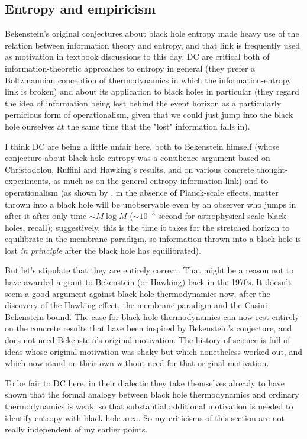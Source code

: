 \documentclass[12pt]{article}
\begin{document}
\subsection{Entropy and empiricism}

Bekenstein's original conjectures about black hole entropy made heavy use of the relation between information theory and entropy, and that link is frequently used as motivation in textbook discussions to this day. DC are critical both of information-theoretic approaches to entropy in general (they prefer a Boltzmannian conception of thermodynamics in which the information-entropy link is broken) and about its application to black holes in particular (they regard the idea of information being lost behind the event horizon as a particularly pernicious form of operationalism, given that we could just jump into the black hole ourselves at the same time that the "lost" information falls in). 

I think DC are being a little unfair here, both to Bekenstein himself (whose conjecture about black hole entropy was a consilience argument based on Christodolou, Ruffini and Hawking's results, and on various concrete thought-experiments, as much as on the general entropy-information link) and to operationalism (as shown by , in the absence of Planck-scale effects, matter thrown into a black hole will be unobservable even by an observer who jumps in after it after only time $\sim M \log M$ ($\sim 10^{-3}$ second for astrophysical-scale black holes, recall); suggestively, this is the time it takes for the stretched horizon to equilibrate in the membrane paradigm, so information thrown into a black hole is lost \emph{in principle} after the black hole has equilibrated). 

But let's stipulate that they are entirely correct. That might be a reason not to have awarded a grant to Bekenstein (or Hawking) back in the 1970s. It doesn't seem a good argument against black hole thermodynamics now, after the discovery of the Hawking effect, the membrane paradigm and the Casini-Bekenstein bound. The case for black hole thermodynamics can now rest entirely on the concrete results that have been inspired by Bekenstein's conjecture, and does not need Bekenstein's original motivation. The history of science is full of ideas whose original motivation was shaky but which nonetheless worked out, and which now stand on their own without need for that original motivation.

To be fair to DC here, in their dialectic they take themselves already to have shown that the formal analogy between black hole thermodynamics and ordinary thermodynamics is weak, so that substantial additional motivation is needed to identify entropy with black hole area. So my criticisms of this section are not really independent of my earlier points.
\end{document}
